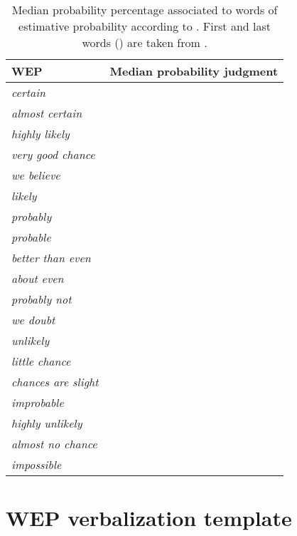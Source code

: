 \documentclass[11pt]{article}
\begin{document}
\vspace{-0.1cm}
\begin{table}[H]
\begin{center}
\begin{tabular}{ll}
\toprule
WEP & \hspace*{-0.8cm}Median probability judgment\\
\midrule
\textit{certain}            &    \\
\textit{almost certain}     &    \\
\textit{highly likely}      &     \\
\textit{very good chance}   &    \\
\textit{we believe}         &    \\
\textit{likely}             &    \\
\textit{probably}           &    \\
\textit{probable}           &    \\
\textit{better than even}   &     \\
\textit{about even}         &     \\
\textit{probably not}       &    \\
\textit{we doubt}           &    \\
\textit{unlikely}           &    \\
\textit{little chance}      &    \\
\textit{chances are slight} &    \\
\textit{improbable}         &    \\
\textit{highly unlikely}    &     \\
\textit{almost no chance}   &     \\
\textit{impossible}         &      \\
\bottomrule
\end{tabular}
\end{center}
\caption{Median probability percentage associated to words of estimative probability according to \cite{fagen-ulmschneider}. First and last words () are taken from \cite{kent1964words}. \label{tab:probs}}
\end{table}



\section{WEP verbalization template\label{sec:appendix}}
\end{document}
